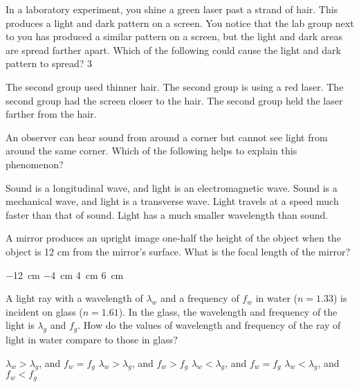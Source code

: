 \documentclass{../../../oss-ap12ibhl}
\begin{document}
\genheader


\begin{questions}
  \question In a laboratory experiment, you shine a green laser past a strand of
  hair. This produces a light and dark pattern on a screen. You notice that
  the lab group next to you has produced a similar pattern on a screen, but
  the light and dark areas are spread farther apart. Which of the following
  could cause the light and dark pattern to spread? 3
  \begin{choices}
    \choice The second group used thinner hair.
    \choice The second group is using a red laser.
    \choice The second group had the screen closer to the hair.
    \choice The second group held the laser farther from the hair.
  \end{choices}
    
  \question An observer can hear sound from around a corner but cannot see light
  from around the same corner. Which of the following helps to explain this
  phenomenon?
  \begin{choices}
    \choice Sound is a longitudinal wave, and light is an electromagnetic wave.
    \choice Sound is a mechanical wave, and light is a transverse wave.
    \choice Light travels at a speed much faster than that of sound.
    \choice Light has a much smaller wavelength than sound.
  \end{choices}
    
  \question A mirror produces an upright image one-half the height of the object
  when the object is 12 cm from the mirror's surface. What is the focal
  length of the mirror?
  \begin{choices}
    \choice\SI{-12}{\centi\metre}
    \choice\SI{-4}{\centi\metre}
    \choice\SI{4}{\centi\metre}
    \choice\SI{6}{\centi\metre}
  \end{choices}

  \question A light ray with a wavelength of $\lambda_w$ and a frequency of
  $f_w$ in water ($n=1.33$) is incident on glass ($n=1.61$). In the glass,
  the wavelength and frequency of the light is $\lambda_g$ and $f_g$. How do
  the values of wavelength and frequency of the ray of light in water compare
  to those in glass?
  \begin{choices}
    \choice $\lambda_w>\lambda_g$, and $f_w=f_g$
    \choice $\lambda_w>\lambda_g$, and $f_w>f_g$
    \choice $\lambda_w<\lambda_g$, and $f_w=f_g$
    \choice $\lambda_w<\lambda_g$, and $f_w<f_g$
  \end{choices}


\end{questions}
\end{document}
